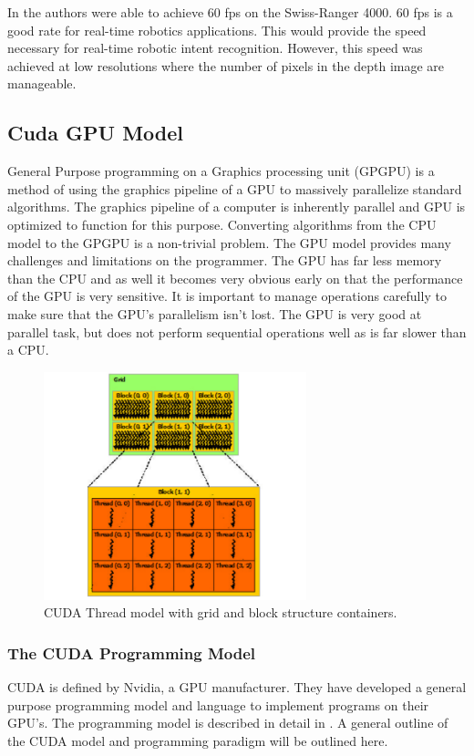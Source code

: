 \documentclass[conference]{IEEEtran}
\begin{document}
In \cite{Baak2011} the authors were able to achieve 60 fps on the Swiss-Ranger 4000. 60 fps is a good rate for real-time robotics applications. This would provide the speed necessary for real-time robotic intent recognition. However, this speed was achieved at low resolutions where the number of pixels in the depth image are manageable. 

\subsection{Cuda GPU Model}
\label{subsec:cudaModel}
General Purpose programming on a Graphics processing unit (GPGPU) is a method of using the graphics pipeline of a GPU to massively parallelize standard algorithms. The graphics pipeline of a computer is inherently parallel and GPU is optimized to function for this purpose. Converting algorithms from the CPU model to the GPGPU is a non-trivial problem. The GPU model provides many challenges and limitations on the programmer. The GPU has far less memory than the CPU and as well it becomes very obvious early on that the performance of the GPU is very sensitive. It is important to manage operations carefully to make sure that the GPU's parallelism isn't lost. The GPU is very good at parallel task, but does not perform sequential operations well as is far slower than a CPU.

\begin{figure}[!t]
\centering
\includegraphics[width=3in]{grid-of-thread-blocks}
\caption{CUDA Thread model with grid and block structure containers.}
\label{fig:gridthreadblocks}
\end{figure}
\subsubsection{The CUDA Programming Model}
CUDA is defined by Nvidia\texttrademark, a GPU manufacturer\cite{Nvidia2014}. They have developed a general purpose programming model and language to implement programs on their GPU's. The programming model is described in detail in \cite{Nvidia2014}. A general outline of the CUDA model and programming paradigm will be outlined here.
\end{document}
